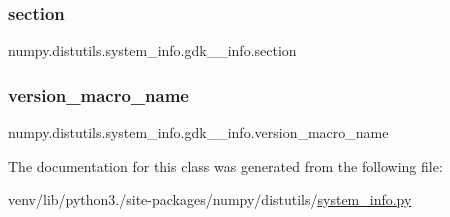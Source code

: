 \subsubsection{\texorpdfstring{section}{section}}
{\footnotesize\ttfamily numpy.\+distutils.\+system\+\_\+info.\+gdk\+\_\+\_\+info.\+section\hspace{0.3cm}{\ttfamily [static]}}

\mbox{\label{classnumpy_1_1distutils_1_1system__info_1_1gdk__2__info_aa300e5a3c88705b42ee1519913fa5795}} 
\subsubsection{\texorpdfstring{version\+\_\+macro\+\_\+name}{version\_macro\_name}}
{\footnotesize\ttfamily numpy.\+distutils.\+system\+\_\+info.\+gdk\+\_\+\_\+info.\+version\+\_\+macro\+\_\+name\hspace{0.3cm}{\ttfamily [static]}}



The documentation for this class was generated from the following file\+:\begin{DoxyCompactItemize}
\item 
venv/lib/python3./site-\/packages/numpy/distutils/\hyperlink{system__info_8py}{system\+\_\+info.\+py}\end{DoxyCompactItemize}
